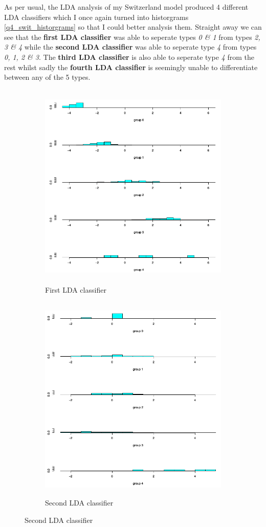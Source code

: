 \documentclass[a4paper]{article}
\begin{document}


As per usual, the LDA analysis of my Switzerland model produced 4 different LDA
classifiers which I once again turned into historgrams \ref{q4_swit_historgrams}
so that I could better analysis them.  Straight away we can see that the
\textbf{first LDA classifier} was able to seperate types \textit{0 \& 1} from
types \textit{2, 3 \& 4} while the \textbf{second LDA classifier} was able to
seperate type \textit{4} from types \textit{0, 1, 2 \& 3}. The \textbf{third LDA
classifier} is also able to seperate type \textit{4} from the rest whilst sadly
the \textbf{fourth LDA classifier} is seemingly unable to differentiate between
any of the 5 types.

\begin{figure}[H]
	\begin{subfigure}{0.5\textwidth}
		\caption{First LDA classifier}
		\includegraphics[width=0.9\linewidth, height=10cm]{Q4_pics/Swit-Hist1.png}
	\end{subfigure}
	\begin{subfigure}{0.5\textwidth}
		\caption{Second LDA classifier}
		\includegraphics[width=0.9\linewidth, height=10cm]{Q4_pics/Swit-Hist2.png}
	\end{subfigure}


\end{figure}
\end{document}

